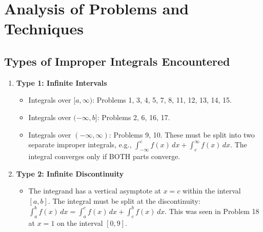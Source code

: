 \documentclass{article}
\begin{document}
\section{Analysis of Problems and Techniques}

\subsection{Types of Improper Integrals Encountered}
\begin{enumerate}
    \item \textbf{Type 1: Infinite Intervals}
    \begin{itemize}
        \item Integrals over $ [a, \infty) $: Problems 1, 3, 4, 5, 7, 8, 11, 12, 13, 14, 15.
        \item Integrals over $ (-\infty, b] $: Problems 2, 6, 16, 17.
        \item Integrals over $ (-\infty, \infty) $: Problems 9, 10. These must be split into two separate improper integrals, e.g., $ \int_{-\infty}^{c} f(x) \,dx + \int_{c}^{\infty} f(x) \,dx $. The integral converges only if BOTH parts converge.
    \end{itemize}
    \item \textbf{Type 2: Infinite Discontinuity}
    \begin{itemize}
        \item The integrand has a vertical asymptote at $x=c$ within the interval $[a, b]$. The integral must be split at the discontinuity: $ \int_{a}^{b} f(x) \,dx = \int_{a}^{c} f(x) \,dx + \int_{c}^{b} f(x) \,dx $. This was seen in Problem 18 at $x=1$ on the interval $[0,9]$.
    \end{itemize}
\end{enumerate}
\end{document}
